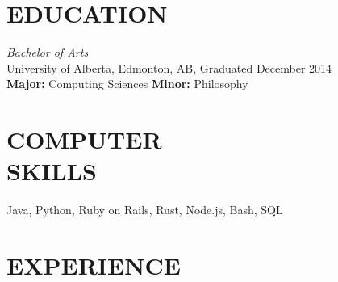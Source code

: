\documentclass[margin, 10pt]{res} %
\begin{document}
\begin{resume}

 



\section{EDUCATION}

{\sl Bachelor of Arts}\\
University of Alberta, Edmonton, AB, Graduated December 2014 \\
{\bf Major:} Computing Sciences {\bf Minor:} Philosophy \\
 

\section{COMPUTER \\ SKILLS} 

Java, Python, Ruby on Rails, Rust, Node.js, Bash, SQL\\
 
 
\section{EXPERIENCE}


\end{resume}
\end{document}
